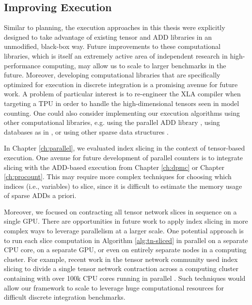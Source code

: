 \subsection{Improving Execution}
Similar to planning, the execution approaches in this thesis were explicitly designed to take advantage of existing tensor and ADD libraries in an unmodified, black-box way.
Future improvements to these computational libraries, which is itself an extremely active area of independent research in high-performance computing, may allow us to scale to larger benchmarks in the future.
Moreover, developing computational libraries that are specifically optimized for execution in discrete integration is a promising avenue for future work.
A problem of particular interest is to re-engineer the XLA compiler when targeting a TPU in order to handle the high-dimensional tensors seen in model counting.
One could also consider implementing our execution algorithms using other computational libraries, e.g. using the parallel ADD library \sylvan{} \cite{van2015sylvan}, using databases as in \cite{fichte2020exploiting}, or using other sparse data structures \cite{sanner2005affine,li2018hicoo}. %

In Chapter \ref{ch:parallel}, we evaluated index slicing in the context of tensor-based execution.
One avenue for future development of parallel counters is to integrate slicing with the ADD-based execution from Chapter \ref{ch:dpmc} or Chapter \ref{ch:procount}.
This may require more complex techniques for choosing which indices (i.e., variables) to slice, since it is difficult to estimate the memory usage of sparse ADDs a priori.

Moreover, we focused on contracting all tensor network slices in sequence on a single GPU.
There are opportunities in future work to apply index slicing in more complex ways to leverage parallelism at a larger scale. 
One potential approach is to run each slice computation in Algorithm \ref{alg:tn-sliced} in parallel on a separate CPU core, on a separate GPU, or even on entirely separate nodes in a computing cluster.
For example, recent work in the tensor network community used index slicing to divide a single tensor network contraction across a computing cluster containing with over 100k CPU cores running in parallel \cite{CZHNS18}.
Such techniques would allow our framework to scale to leverage huge computational resources for difficult discrete integration benchmarks.



